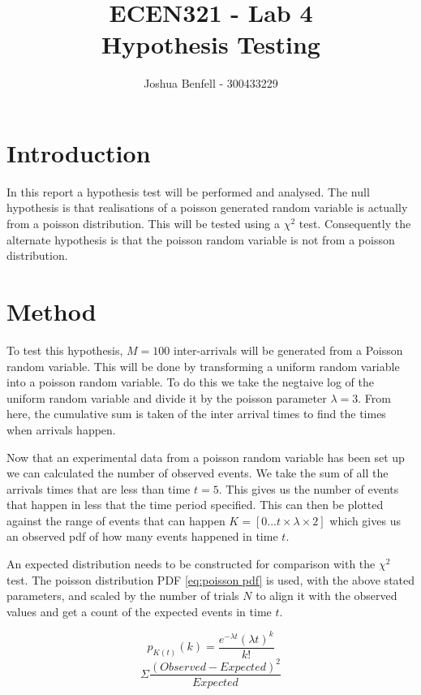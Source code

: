 \documentclass[a4paper, 12pt]{article}
\title{ECEN321 - Lab 4 \\
    Hypothesis Testing
}
\author{Joshua Benfell - 300433229}
\begin{document}
    \maketitle
    
    \section{Introduction}
        In this report a hypothesis test will be performed and analysed. The null hypothesis is that realisations of a poisson generated random variable is actually from a poisson distribution. This will be tested using a $\chi^2$ test. Consequently the alternate hypothesis is that the poisson random variable is not from a poisson distribution.

    \section{Method}
        To test this hypothesis, $M = 100$ inter-arrivals will be generated from a Poisson random variable. This will be done by transforming a uniform random variable into a poisson random variable. To do this we take the negtaive log of the uniform random variable and divide it by the poisson parameter $\lambda = 3$. From here, the cumulative sum is taken of the inter arrival times to find the times when arrivals happen. 
        \par
        Now that an experimental data from a poisson random variable has been set up we can calculated the number of observed events. We take the sum of all the arrivals times that are less than time $t=5$. This gives us the number of events that happen in less that the time period specified. This can then be plotted against the range of events that can happen $K = [0 ... t \times \lambda \times 2]$ which gives us an observed pdf of how many events happened in time $t$.
        \par
        An expected distribution needs to be constructed for comparison with the $\chi^2$ test. The poisson distribution PDF \cref{eq:poisson pdf} is used, with the above stated parameters, and scaled by the number of trials $N$ to align it with the observed values and get a count of the expected events in time $t$.

        \begin{equation}
            \label{eq:poisson pdf}
            p_{K(t)}(k) = \frac{e^{-\lambda t}(\lambda t)^k}{k!}
        \end{equation}
        \begin{equation}
            \label{eq:chi2}
            \Sigma \frac{(Observed - Expected)^2}{Expected}
        \end{equation}
\end{document}
